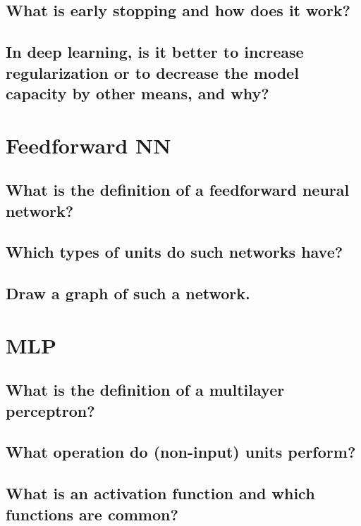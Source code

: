 \subsection{What is early stopping and how does it work?}

\subsection{In deep learning, is it better to increase regularization or to decrease the model capacity by other means, and why?}

\section{Feedforward NN}

\subsection{What is the definition of a feedforward neural network?}

\subsection{Which types of units do such networks have?}

\subsection{Draw a graph of such a network.}

\section{MLP}

\subsection{What is the definition of a multilayer perceptron?}

\subsection{What operation do (non-input) units perform?}

\subsection{What is an activation function and which functions are common?}

